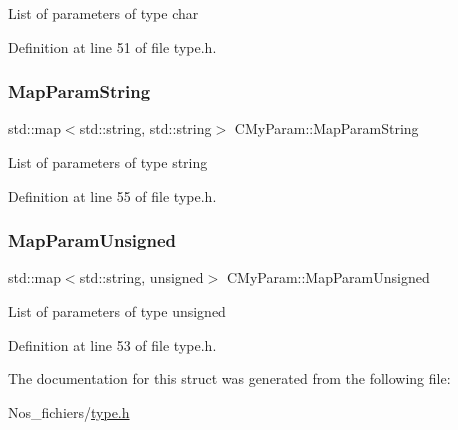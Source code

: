 List of parameters of type char 

Definition at line 51 of file type.\+h.

\mbox{\label{struct_c_my_param_a6f22660b5eff76608f47c52930e6ecf1}} 
\subsubsection{\texorpdfstring{Map\+Param\+String}{MapParamString}}
{\footnotesize\ttfamily std\+::map$<$std\+::string, std\+::string$>$ C\+My\+Param\+::\+Map\+Param\+String}

List of parameters of type string 

Definition at line 55 of file type.\+h.

\mbox{\label{struct_c_my_param_aece7d4bdf4103e359f769d08e97a459d}} 
\subsubsection{\texorpdfstring{Map\+Param\+Unsigned}{MapParamUnsigned}}
{\footnotesize\ttfamily std\+::map$<$std\+::string, unsigned$>$ C\+My\+Param\+::\+Map\+Param\+Unsigned}

List of parameters of type unsigned 

Definition at line 53 of file type.\+h.



The documentation for this struct was generated from the following file\+:\begin{DoxyCompactItemize}
\item 
Nos\+\_\+fichiers/\hyperlink{type_8h}{type.\+h}\end{DoxyCompactItemize}
